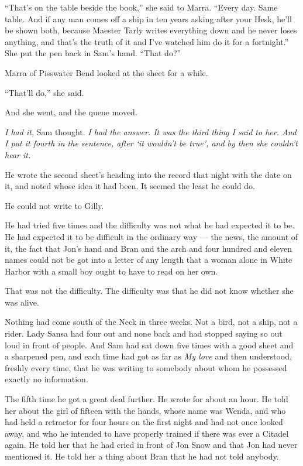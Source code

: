 “That’s on the table beside the book,” she said to Marra. “Every day. Same table. And if any man comes off a ship in ten years asking after your Hesk, he’ll be shown both, because Maester Tarly writes everything down and he never loses anything, and that’s the truth of it and I’ve watched him do it for a fortnight.” She put the pen back in Sam’s hand. “That do?”

Marra of Pisswater Bend looked at the sheet for a while.

“That’ll do,” she said.

And she went, and the queue moved.

\textit{I had it,} Sam thought. \textit{I had the answer. It was the third thing I said to her. And I put it fourth in the sentence, after ‘it wouldn’t be true’, and by then she couldn’t hear it.}

He wrote the second sheet’s heading into the record that night with the date on it, and noted whose idea it had been. It seemed the least he could do.

\sceneBreak

He could not write to Gilly.

He had tried five times and the difficulty was not what he had expected it to be. He had expected it to be difficult in the ordinary way — the news, the amount of it, the fact that Jon’s hand and Bran and the arch and four hundred and eleven names could not be got into a letter of any length that a woman alone in White Harbor with a small boy ought to have to read on her own.

That was not the difficulty. The difficulty was that he did not know whether she was alive.

Nothing had come south of the Neck in three weeks. Not a bird, not a ship, not a rider. Lady Sansa had four out and none back and had stopped saying so out loud in front of people. And Sam had sat down five times with a good sheet and a sharpened pen, and each time had got as far as \textit{My love} and then understood, freshly every time, that he was writing to somebody about whom he possessed exactly no information.

The fifth time he got a great deal further. He wrote for about an hour. He told her about the girl of fifteen with the hands, whose name was Wenda, and who had held a retractor for four hours on the first night and had not once looked away, and who he intended to have properly trained if there was ever a Citadel again. He told her that he had cried in front of Jon Snow and that Jon had never mentioned it. He told her a thing about Bran that he had not told anybody.

